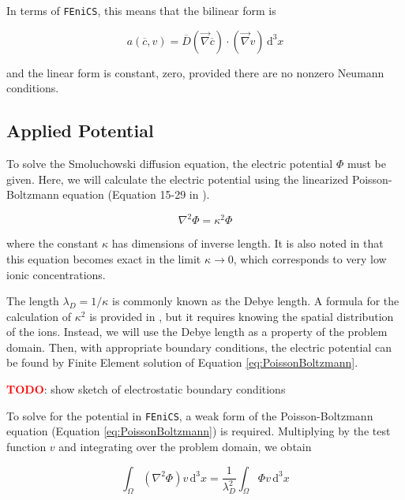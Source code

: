 In terms of \texttt{FEniCS}, this means that the bilinear form is

\begin{equation}
  \boxed{
    a(\overline{c},v)= \overline{D} \left(\vec{\nabla}\overline{c}\right) \cdot \left(\vec{\nabla}v\right)\,\mathrm{d}^3x
  }
\end{equation}

and the linear form is constant, zero, provided there are no nonzero Neumann conditions.


\subsection{Applied Potential}\label{subsec:unhom_smol_potential}

To solve the Smoluchowski diffusion equation, the electric potential $\Phi$ must be given.
Here, we will calculate the electric potential using the linearized Poisson-Boltzmann equation
(Equation 15-29 in \cite{McQuarrie-StatMech}).

\begin{equation}\label{eq:PoissonBoltzmann}
  \nabla^2 \Phi = \kappa^2 \Phi
\end{equation}

where the constant $\kappa$ has dimensions of inverse length.
It is also noted in \cite{McQuarrie-StatMech} that this equation becomes exact
in the limit $\kappa \rightarrow 0$,
which corresponds to very low ionic concentrations.

The length $\lambda_D = 1/\kappa$ is commonly known as the Debye length.
A formula for the calculation of $\kappa^2$ is provided in \cite{McQuarrie-StatMech},
but it requires knowing the spatial distribution of the ions.
Instead, we will use the Debye length as a property of the problem domain.
Then, with appropriate boundary conditions,
the electric potential can be found by Finite Element solution of Equation \ref{eq:PoissonBoltzmann}.

\textcolor{red}{\textbf{TODO}}: show sketch of electrostatic boundary conditions

To solve for the potential in \texttt{FEniCS},
a weak form of the Poisson-Boltzmann equation (Equation \ref{eq:PoissonBoltzmann}) is required.
Multiplying by the test function $v$ and integrating over the problem domain, we obtain

\begin{equation}
  \int_{\Omega} \left(\nabla^2 \Phi \right) v \,\mathrm{d}^3x = \frac{1}{\lambda_D^2} \int_{\Omega} \Phi v \,\mathrm{d}^3x
\end{equation}

